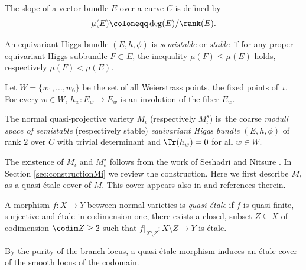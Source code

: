 The slope of a vector bundle $E$ over a curve $C$ is defined by
\[
\mu(E)\coloneqq \deg(E)/\rank(E).
\]

\begin{defn}
An equivariant Higgs bundle $(E, h, \phi)$ is \emph{semistable} or \emph{stable}~if for any proper equivariant Higgs subbundle $F \subset E$, the inequality $\mu(F)\leq \mu(E)$ holds, respectively $\mu(F)< \mu(E)$.
\end{defn}
Let $W = \{w_1, \ldots, w_6\}$ be the set of all Weierstrass points, \ie the fixed points of~$\iota$. For every $w \in W$, $h_w\colon E_w \to E_w$ is an involution of the fiber $E_w$.
\begin{defn}
The normal quasi-projective variety $M_{\iota}$ (respectively $M^{s}_{\iota}$) is~the coarse \emph{moduli space of semistable} (respectively stable) \emph{equivariant Higgs bundle} $(E, h, \phi)$ of rank $2$ over $C$ with trivial determinant and $\Tr(h_{w})=0$ for all $w \in W$.
\end{defn}
The existence of $M_{\iota}$ and $M^{s}_{\iota}$ follows from the work of Seshadri \cite{Seshadri70} and Nitsure \cite{Nitsure91}. In Section \ref{sec:constructionMi} we review the construction. Here we first describe $M_{\iota}$ as a quasi-étale cover of $M$. This cover appears also in \cite[\S 6.3]{HeuLoray19} and references therein.

\begin{defn}
A morphism $f\colon X \to Y$ between normal varieties is \emph{quasi-étale} if $f$ is quasi-finite, surjective and étale in codimension one, \ie there exists a closed, subset $Z \subseteq X$ of codimension $\codim Z \geq 2$ such that $f|_{X \setminus Z}\colon X \setminus Z \to Y$ is étale.
\end{defn}
\begin{rmk}\label{rmk:purity}
By the purity of the branch locus, a quasi-étale morphism induces an étale cover of the smooth locus of the codomain.
\end{rmk}

